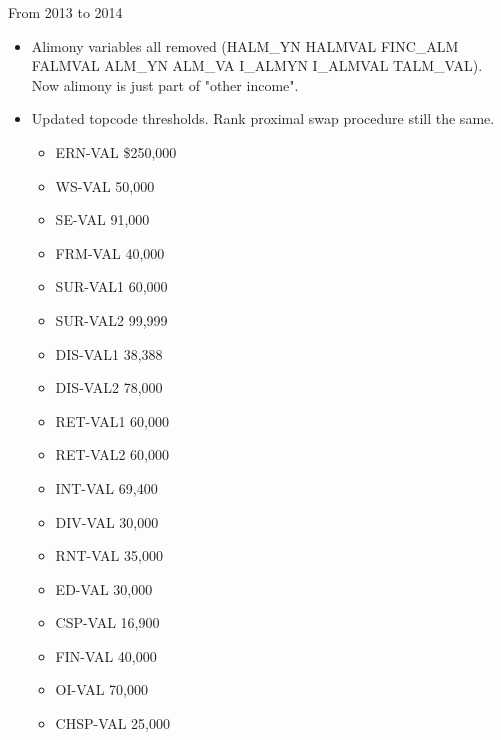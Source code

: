 \documentclass{article}
\begin{document}
From 2013 to 2014
\begin{itemize}
	\item Alimony variables all removed (HALM\_YN
	HALMVAL FINC\_ALM FALMVAL ALM\_YN ALM\_VA	I\_ALMYN I\_ALMVAL TALM\_VAL). Now alimony is just part of "other income".
	\item Updated topcode thresholds. Rank proximal swap procedure still the same.
	\begin{itemize}
		\item ERN-VAL \$250,000
		\item WS-VAL	50,000 
		\item SE-VAL 91,000
		\item FRM-VAL 40,000  
		\item SUR-VAL1 60,000
		\item SUR-VAL2 99,999 
		\item DIS-VAL1 38,388
		\item DIS-VAL2 78,000
		\item RET-VAL1 60,000
		\item RET-VAL2 60,000
		\item INT-VAL 69,400
		\item DIV-VAL 30,000
		\item RNT-VAL 35,000
		\item ED-VAL 30,000
		\item CSP-VAL 16,900
		\item FIN-VAL 40,000
		\item OI-VAL 70,000
		\item CHSP-VAL 25,000
	\end{itemize}
\end{itemize}
\end{document}
